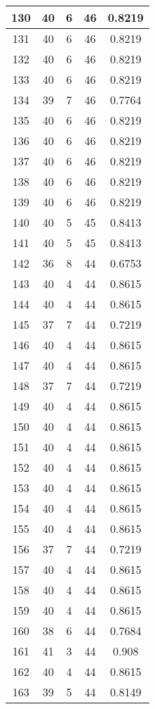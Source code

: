 \documentclass[letterpaper, 12pt]{article}
\begin{document}
\begin{longtable}{|c|c|c|c|c|}
\hline
130 & 40 & 6 & 46 & 0.8219 \\
\hline
131 & 40 & 6 & 46 & 0.8219 \\
\hline
132 & 40 & 6 & 46 & 0.8219 \\
\hline
133 & 40 & 6 & 46 & 0.8219 \\
\hline
134 & 39 & 7 & 46 & 0.7764 \\
\hline
135 & 40 & 6 & 46 & 0.8219 \\
\hline
136 & 40 & 6 & 46 & 0.8219 \\
\hline
137 & 40 & 6 & 46 & 0.8219 \\
\hline
138 & 40 & 6 & 46 & 0.8219 \\
\hline
139 & 40 & 6 & 46 & 0.8219 \\
\hline
140 & 40 & 5 & 45 & 0.8413 \\
\hline
141 & 40 & 5 & 45 & 0.8413 \\
\hline
142 & 36 & 8 & 44 & 0.6753 \\
\hline
143 & 40 & 4 & 44 & 0.8615 \\
\hline
144 & 40 & 4 & 44 & 0.8615 \\
\hline
145 & 37 & 7 & 44 & 0.7219 \\
\hline
146 & 40 & 4 & 44 & 0.8615 \\
\hline
147 & 40 & 4 & 44 & 0.8615 \\
\hline
148 & 37 & 7 & 44 & 0.7219 \\
\hline
149 & 40 & 4 & 44 & 0.8615 \\
\hline
150 & 40 & 4 & 44 & 0.8615 \\
\hline
151 & 40 & 4 & 44 & 0.8615 \\
\hline
152 & 40 & 4 & 44 & 0.8615 \\
\hline
153 & 40 & 4 & 44 & 0.8615 \\
\hline
154 & 40 & 4 & 44 & 0.8615 \\
\hline
155 & 40 & 4 & 44 & 0.8615 \\
\hline
156 & 37 & 7 & 44 & 0.7219 \\
\hline
157 & 40 & 4 & 44 & 0.8615 \\
\hline
158 & 40 & 4 & 44 & 0.8615 \\
\hline
159 & 40 & 4 & 44 & 0.8615 \\
\hline
160 & 38 & 6 & 44 & 0.7684 \\
\hline
161 & 41 & 3 & 44 & 0.908 \\
\hline
162 & 40 & 4 & 44 & 0.8615 \\
\hline
163 & 39 & 5 & 44 & 0.8149 \\

\end{longtable}
\end{document}
